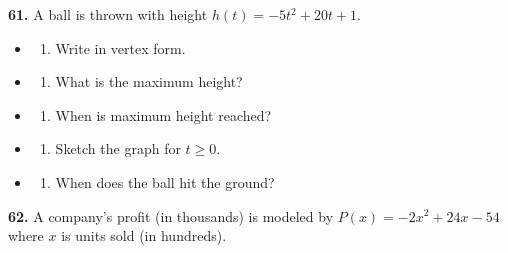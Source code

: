 \documentclass[
  11pt,
]{article}
\providecommand{\tightlist}{%
  \setlength{\itemsep}{0pt}\setlength{\parskip}{0pt}}
\begin{document}
\textbf{61.} A ball is thrown with height \(h(t) = -5t^2 + 20t + 1\).

\begin{itemize}
\item
  \begin{enumerate}
  \def\labelenumi{(\alph{enumi})}
  \tightlist
  \item
    Write in vertex form.
  \end{enumerate}
\item
  \begin{enumerate}
  \def\labelenumi{(\alph{enumi})}
  \setcounter{enumi}{1}
  \tightlist
  \item
    What is the maximum height?
  \end{enumerate}
\item
  \begin{enumerate}
  \def\labelenumi{(\alph{enumi})}
  \setcounter{enumi}{2}
  \tightlist
  \item
    When is maximum height reached?
  \end{enumerate}
\item
  \begin{enumerate}
  \def\labelenumi{(\alph{enumi})}
  \setcounter{enumi}{3}
  \tightlist
  \item
    Sketch the graph for \(t \geq 0\).
  \end{enumerate}
\item
  \begin{enumerate}
  \def\labelenumi{(\alph{enumi})}
  \setcounter{enumi}{4}
  \tightlist
  \item
    When does the ball hit the ground?
  \end{enumerate}
\end{itemize}

\textbf{62.} A company's profit (in thousands) is modeled by
\(P(x) = -2x^2 + 24x - 54\) where \(x\) is units sold (in hundreds).
\end{document}
